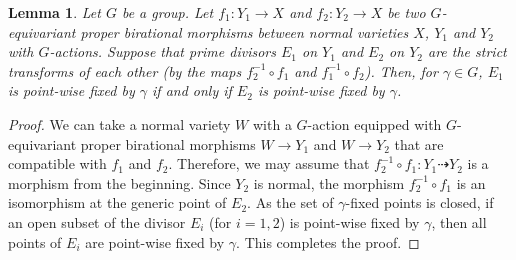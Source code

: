 \documentclass[a4paper,11pt]{amsart}
\newtheorem{lem}[thm]{Lemma}
\theoremstyle{definition}
\theoremstyle{remark}
\begin{document}
\begin{lem}\label{lem:model_change}
Let $G$ be a group. Let $f_1: Y_1 \to X$ and $f_2: Y_2 \to X$ be two $G$-equivariant proper birational morphisms between normal varieties $X$, $Y_1$ and $Y_2$ with $G$-actions. 
Suppose that prime divisors $E_1$ on $Y_1$ and $E_2$ on $Y_2$ are the strict transforms of each other (by the maps $f_2 ^{-1} \circ f_1$ and $f_1 ^{-1} \circ f_2$). 
Then, for $\gamma \in G$, $E_1$ is point-wise fixed by $\gamma$ if and only if $E_2$ is point-wise fixed by $\gamma$. 
\end{lem}
\begin{proof}
We can take a normal variety $W$ with a $G$-action equipped with $G$-equivariant proper birational morphisms $W \to Y_1$ and $W \to Y_2$ that are compatible with $f_1$ and $f_2$. 
Therefore, we may assume that $f_2 ^{-1} \circ f_1 : Y_1 \dasharrow Y_2$ is a morphism from the beginning. 
Since $Y_2$ is normal, the morphism $f_2 ^{-1} \circ f_1$ is an isomorphism at the generic point of $E_2$. 
As the set of $\gamma$-fixed points is closed, if an open subset of the divisor $E_i$ (for $i = 1, 2$) is point-wise fixed by $\gamma$, then all points of $E_i$ are point-wise fixed by $\gamma$.
This completes the proof. 
\end{proof}
\end{document}
